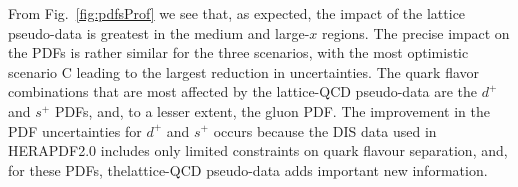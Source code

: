 From Fig.~\ref{fig:pdfsProf} we see that, as expected, the
impact of the lattice pseudo-data is greatest in the medium and large-$x$ regions.
%
The precise impact on the PDFs is rather
similar for the three scenarios, with the most optimistic
scenario C leading to the largest reduction in uncertainties.
%
The quark flavor combinations that are most affected by the
lattice-QCD pseudo-data are the $d^{+}$ and $s^{+}$ PDFs,
and, to a lesser extent, the gluon PDF.
%
The improvement in the PDF uncertainties for $d^{+}$ and $s^{+}$
occurs because the DIS data
used in HERAPDF2.0 includes only limited constraints
on quark flavour separation, ​and,​ ​for​ ​these​ ​PDFs,​ ​the​ ​lattice-QCD​ ​pseudo-data​ ​adds​ ​important​ ​new
information.
